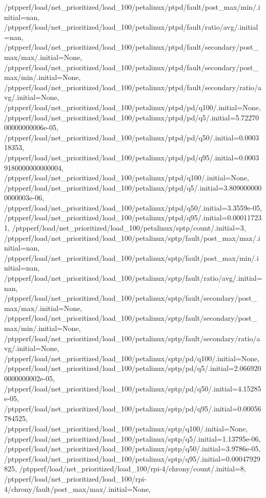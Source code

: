 {    /ptpperf/load/net_prioritized/load_100/petalinux/ptpd/fault/post_max/min/.initial=nan,
    /ptpperf/load/net_prioritized/load_100/petalinux/ptpd/fault/ratio/avg/.initial=nan,
    /ptpperf/load/net_prioritized/load_100/petalinux/ptpd/fault/secondary/post_max/max/.initial=None,
    /ptpperf/load/net_prioritized/load_100/petalinux/ptpd/fault/secondary/post_max/min/.initial=None,
    /ptpperf/load/net_prioritized/load_100/petalinux/ptpd/fault/secondary/ratio/avg/.initial=None,
    /ptpperf/load/net_prioritized/load_100/petalinux/ptpd/pd/q100/.initial=None,
    /ptpperf/load/net_prioritized/load_100/petalinux/ptpd/pd/q5/.initial=5.7227000000000006e-05,
    /ptpperf/load/net_prioritized/load_100/petalinux/ptpd/pd/q50/.initial=0.000318353,
    /ptpperf/load/net_prioritized/load_100/petalinux/ptpd/pd/q95/.initial=0.00039180000000000004,
    /ptpperf/load/net_prioritized/load_100/petalinux/ptpd/q100/.initial=None,
    /ptpperf/load/net_prioritized/load_100/petalinux/ptpd/q5/.initial=3.8090000000000003e-06,
    /ptpperf/load/net_prioritized/load_100/petalinux/ptpd/q50/.initial=3.3559e-05,
    /ptpperf/load/net_prioritized/load_100/petalinux/ptpd/q95/.initial=0.000117231,
    /ptpperf/load/net_prioritized/load_100/petalinux/sptp/count/.initial=3,
    /ptpperf/load/net_prioritized/load_100/petalinux/sptp/fault/post_max/max/.initial=nan,
    /ptpperf/load/net_prioritized/load_100/petalinux/sptp/fault/post_max/min/.initial=nan,
    /ptpperf/load/net_prioritized/load_100/petalinux/sptp/fault/ratio/avg/.initial=nan,
    /ptpperf/load/net_prioritized/load_100/petalinux/sptp/fault/secondary/post_max/max/.initial=None,
    /ptpperf/load/net_prioritized/load_100/petalinux/sptp/fault/secondary/post_max/min/.initial=None,
    /ptpperf/load/net_prioritized/load_100/petalinux/sptp/fault/secondary/ratio/avg/.initial=None,
    /ptpperf/load/net_prioritized/load_100/petalinux/sptp/pd/q100/.initial=None,
    /ptpperf/load/net_prioritized/load_100/petalinux/sptp/pd/q5/.initial=2.0669200000000002e-05,
    /ptpperf/load/net_prioritized/load_100/petalinux/sptp/pd/q50/.initial=4.15285e-05,
    /ptpperf/load/net_prioritized/load_100/petalinux/sptp/pd/q95/.initial=0.00056784525,
    /ptpperf/load/net_prioritized/load_100/petalinux/sptp/q100/.initial=None,
    /ptpperf/load/net_prioritized/load_100/petalinux/sptp/q5/.initial=1.13795e-06,
    /ptpperf/load/net_prioritized/load_100/petalinux/sptp/q50/.initial=3.9786e-05,
    /ptpperf/load/net_prioritized/load_100/petalinux/sptp/q95/.initial=0.00047929825,
    /ptpperf/load/net_prioritized/load_100/rpi-4/chrony/count/.initial=8,
    /ptpperf/load/net_prioritized/load_100/rpi-4/chrony/fault/post_max/max/.initial=None,
}
